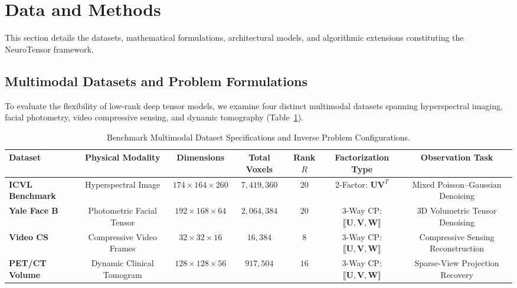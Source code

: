 \section{Data and Methods}
\label{sec:data_methods}

This section details the datasets, mathematical formulations, architectural models, and algorithmic extensions constituting the NeuroTensor framework.

\subsection{Multimodal Datasets and Problem Formulations}
\label{subsec:datasets}
To evaluate the flexibility of low-rank deep tensor models, we examine four distinct multimodal datasets spanning hyperspectral imaging, facial photometry, video compressive sensing, and dynamic tomography (Table~\ref{tab:dataset_specs}).

\begin{table}[htbp]
\centering
\caption{Benchmark Multimodal Dataset Specifications and Inverse Problem Configurations.}
\label{tab:dataset_specs}
\begin{adjustbox}{width=0.98\textwidth}
\begin{tabular}{lcccccc}
\toprule
\textbf{Dataset} & \textbf{Physical Modality} & \textbf{Dimensions} & \textbf{Total Voxels} & \textbf{Rank $R$} & \textbf{Factorization Type} & \textbf{Observation Task} \\
\midrule
\textbf{ICVL Benchmark} & Hyperspectral Image & $174 \times 164 \times 260$ & $7,419,360$ & $20$ & 2-Factor: $\mathbf{U} \mathbf{V}^T$ & Mixed Poisson--Gaussian Denoising \\
\textbf{Yale Face B} & Photometric Facial Tensor & $192 \times 168 \times 64$ & $2,064,384$ & $20$ & 3-Way CP: $\llbracket \mathbf{U}, \mathbf{V}, \mathbf{W} \rrbracket$ & 3D Volumetric Tensor Denoising \\
\textbf{Video CS} & Compressive Video Frames & $32 \times 32 \times 16$ & $16,384$ & $8$ & 3-Way CP: $\llbracket \mathbf{U}, \mathbf{V}, \mathbf{W} \rrbracket$ & Compressive Sensing Reconstruction \\
\textbf{PET/CT Volume} & Dynamic Clinical Tomogram & $128 \times 128 \times 56$ & $917,504$ & $16$ & 3-Way CP: $\llbracket \mathbf{U}, \mathbf{V}, \mathbf{W} \rrbracket$ & Sparse-View Projection Recovery \\
\bottomrule
\end{tabular}
\end{adjustbox}
\end{table}


